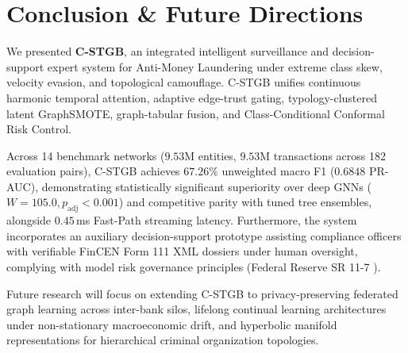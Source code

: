\section{Conclusion \& Future Directions}
\label{sec:conclusion}
We presented \textbf{C-STGB}, an integrated intelligent surveillance and decision-support expert system for Anti-Money Laundering under extreme class skew, velocity evasion, and topological camouflage. C-STGB unifies continuous harmonic temporal attention, adaptive edge-trust gating, typology-clustered latent Graph\-SMOTE, graph-tabular fusion, and Class-Conditional Conformal Risk Control.

Across 14 benchmark networks ($9.53\text{M}$ entities, $9.53\text{M}$ transactions across 182 evaluation pairs), C-STGB achieves $67.26\%$ unweighted macro F1 ($0.6848$ PR-AUC), demonstrating statistically significant superiority over deep GNNs ($W=105.0, p_{\text{adj}} < 0.001$) and competitive parity with tuned tree ensembles, alongside $0.45$\,ms Fast-Path streaming latency. Furthermore, the system incorporates an auxiliary decision-support prototype assisting compliance officers with verifiable FinCEN Form 111 XML dossiers under human oversight, complying with model risk governance principles (Federal Reserve SR 11-7 \citep{fed2011sr117}).

Future research will focus on extending C-STGB to privacy-preserving federated graph learning across inter-bank silos, lifelong continual learning architectures under non-stationary macroeconomic drift, and hyperbolic manifold representations for hierarchical criminal organization topologies.
